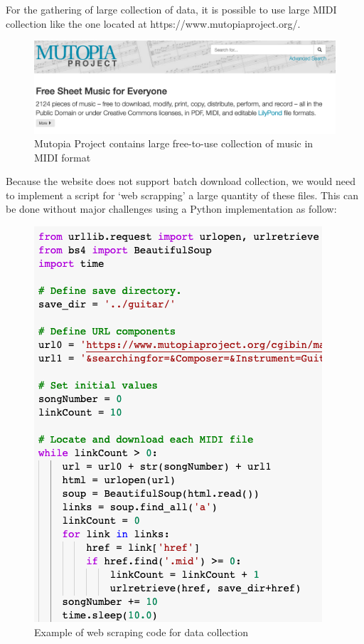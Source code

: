 For the gathering of large collection of data, it is possible to use large MIDI collection
like the one located at https://www.mutopiaproject.org/.

\begin{figure}[h!]
  \caption{Mutopia Project contains large free-to-use collection of music in MIDI format }
  \includegraphics[width=\linewidth]{image/fig_JDF15.png}
\end{figure}


Because the website does not support batch download collection, we would need to implement
a script for ‘web scrapping’ a large quantity of these files. This can be done without
major challenges using a Python implementation as follow:

\begin{figure}[h!]
  \caption{Example of web scraping code for data collection }
  \includegraphics[width=\linewidth]{image/fig_JDF16.png}
\end{figure}


